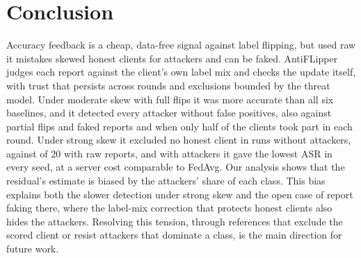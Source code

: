\documentclass[journal]{IEEEtran}
\begin{document}
\section{Conclusion}
\label{sec:conclusion}
Accuracy feedback is a cheap, data-free signal against label flipping, but used raw it mistakes skewed honest clients for attackers and can be faked. AntiFLipper judges each report against the client's own label mix and checks the update itself, with trust that persists across rounds and exclusions bounded by the threat model. Under moderate skew with full flips it was more accurate than all six baselines, and it detected every attacker without false positives, also against partial flips and faked reports and when only half of the clients took part in each round. Under strong skew it excluded no honest client in runs without attackers, against \cleanHonRaw{} of 20 with raw reports, and with attackers it gave the lowest ASR in every seed, at a server cost comparable to FedAvg. Our analysis shows that the residual's estimate is biased by the attackers' share of each class. This bias explains both the slower detection under strong skew and the open case of report faking there, where the label-mix correction that protects honest clients also hides the attackers. Resolving this tension, through references that exclude the scored client or resist attackers that dominate a class, is the main direction for future work.



\end{document}
